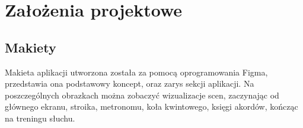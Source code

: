 \chapter{Założenia projektowe}





\section{Makiety}
Makieta aplikacji utworzona została za pomocą oprogramowania Figma, %
przedstawia ona podstawowy koncept, oraz zarys sekcji aplikacji. Na poszczególnych obrazkach można zobaczyć wizualizacje scen, zaczynając od głównego ekranu, stroika, metronomu, koła kwintowego, księgi akordów, kończąc na treningu słuchu. 

